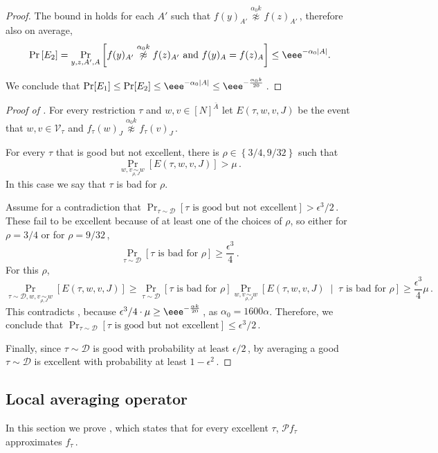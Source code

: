 \documentclass{toc}
\newcommand{\Prob}[2][]{\Pr_{{#1}}\left[#2\right]} %
\newcommand{\abs}[1]{\lvert#1\rvert} %
\newcommand{\given}{\;\middle\vert\;} %
\newcommand{\Set}[1]{\left\{#1\right\}} %
\newcommand\f{f} %
\newcommand\bh{\mathcal{P}\f_\tau} %
\newcommand\neqg[1]{\stackrel{{#1}}{ \not\approx}} %
\newcommand\cons{\mathcal{V}} %
\newcommand\cor[1]{\underset{\scriptscriptstyle#1}{\sim}} %
\begin{document}
\begin{proof}
	The bound in  holds for each $A'$ such that $\f(y)_{A'}\neqg{\alpha_0 k}\f(z)_{A'}$\,, therefore also on average,
	\[ \Prob{E_2}=\Prob[y,z,A',A]{\f(y)_{A'}\neqg{\alpha_0 k}\f(z)_{A'} \textrm{ and } \f(y)_{A}=\f(z)_{A}} \leq  \eee^{-\alpha_0 \abs{A}}. \]
	
	We conclude that $\Pr[E_1]\leq \Pr[E_2]\leq \eee^{-\alpha_0 \abs{A}}\leq \eee^{-\frac{\alpha_0 k}{20}}$\,.
%
%
%
%
%
\end{proof}

\begin{proof}[Proof of ]
	For every restriction $\tau$ and $w,v\in[N]^{\bar{A}}$ let $E(\tau,w,v,J)$ be the event that $ w,v\in\cons_\tau$ and $ f_\tau(w)_J \neqg{\alpha_0 k} f_\tau(v)_J$\,. %
	
	For every $\tau$ that is good but not excellent, there is 
	$\rho\in \Set{3/4,9/32} $ %
	such that
	\[ \Prob[w,v\cor{\rho,J}{w}]{E(\tau,w,v,J)} > \mu\,. \] %
	In this case we say that $\tau$ is bad for $\rho$.
	
Assume %
for a  %
contradiction that $\Prob[\tau\sim\mathcal{D}]{\tau \text{ is good but not excellent}}>
%
\epsilon^3/2$\,. %
These fail to be excellent because of at least one of the choices of $\rho$, so either for 
%
$\rho = 3/4 $ or for $\rho = 9/32 $\,,%
	\[ \Prob[\tau\sim\mathcal{D}]{\tau \text{ is bad for }\rho} \geq \frac{\epsilon^3}{4}\,. \] %
	For this $\rho$,
	\[ \Prob[\tau\sim\mathcal{D},w,v\cor{\rho,J}{w}]{E(\tau,w,v,J)} \geq \Prob[\tau\sim\mathcal{D}]{\tau \text{ is bad for }\rho}\Prob[w,v\cor{\rho,J}{w}]{E(\tau,w,v,J) \given \tau \text{ is bad for }\rho} \geq \frac{\epsilon^3}{4}\mu\,.  \] %
	This contradicts , because 
%
$\epsilon^3/4\cdot\mu  \geq \eee^{-\frac{\alpha k}{20}} $\,, %
%
as $\alpha_0 = 1600\alpha$.  Therefore, we conclude that $\Prob[\tau\sim\mathcal{D}]{\tau \text{ is good but not excellent}}\leq
%
	\epsilon^3/2$\,.%
	
	Finally, since $\tau\sim\mathcal{D}$ is good with probability at least 
${\epsilon}/{2}$\,, %
by  averaging a good $\tau\sim\mathcal{D}$ is excellent with probability at least $1-\epsilon^2$\,.
\end{proof}


\subsection{Local averaging operator} \label{sec:local average}
In this section we prove , which states that for every excellent $\tau$, $\bh$ approximates $\f_\tau$\,. 
\end{document}
